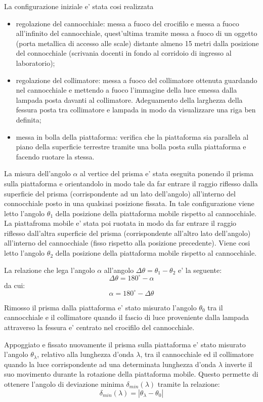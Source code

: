 La configurazione iniziale e' stata cosi realizzata
\begin{itemize}
	\item regolazione del cannocchiale: messa a fuoco del crocifilo e messa a fuoco all'infinito del cannocchiale, quest'ultima tramite messa a fuoco di un oggetto (porta metallica di accesso alle scale) distante almeno 15 metri dalla posizione del connocchiale (scrivania docenti in fondo al corridoio di ingresso al laboratorio);
	\item regolazione del collimatore: messa a fuoco del collimatore ottenuta guardando nel cannocchiale e mettendo a fuoco l'immagine della luce emessa dalla lampada posta davanti al collimatore. Adeguamento della larghezza della fessura posta tra collimatore e lampada in modo da visualizzare una riga ben definita;
	\item messa in bolla della piattaforma: verifica che la piattaforma sia parallela al piano della superficie terrestre tramite una bolla posta sulla piattaforma e facendo ruotare la stessa.
\end{itemize}

La misura dell'angolo $\alpha$ al vertice del prisma e' stata eseguita ponendo il prisma sulla piattaforma e orientandolo in modo tale da far entrare il raggio riflesso dalla superficie del prisma (corrispondente ad un lato dell'angolo) all'interno del connocchiale posto in una qualsiasi posizione fissata. In tale configurazione viene letto l'angolo $\theta_1$ della posizione della piattaforma mobile rispetto al cannocchiale.
La piattafroma mobile e' stata poi ruotata in modo da far entrare il raggio riflesso dall'altra superficie del prisma (corrispondente all'altro lato dell'angolo) all'interno del cannocchiale (fisso rispetto alla posizione precedente). Viene cosi letto l'angolo $\theta_2$ della posizione della piattaforma mobile rispetto al cannocchiale.

La relazione che lega l'angolo $\alpha$ all'angolo $\Delta \theta = \theta_1 - \theta_2$ e' la seguente:
\[
	\Delta \theta = 180^{\circ} - \alpha
\]
da cui:
\[
	\alpha = 180^{\circ} - \Delta \theta
\]

Rimosso il prisma dalla piattaforma e' stato misurato l'angolo $\theta_0$ tra il cannocchiale e il collimatore quando il fascio di luce proveniente dalla lampada attraverso la fessura e' centrato nel crocifilo del cannocchiale.

Appoggiato e fissato nuovamente il prisma sulla piattaforma e' stato misurato l'angolo $\theta_{\lambda}$, relativo alla lunghezza d'onda $\lambda$, tra il cannocchiale ed il collimatore quando la luce corrispondente ad una determinata lunghezza d'onda $\lambda$ inverte il suo movimento durante la rotazione della piattaforma mobile.
Questo permette di ottenere l'angolo di deviazione minima $\delta_{min} (\lambda)$ tramite la relazione:
\[
	\delta_{min} (\lambda) = |\theta_{\lambda} - \theta_0|
\]

